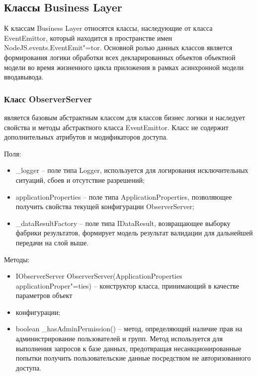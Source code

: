 \subsection{Классы Business Layer}
\label{sub:arch_and_mod:probab_net}

К классам Business Layer относятся классы, наследующие от класса EventEmittor, который находится в пространстве имен NodeJS.events.EventEmit"=tor. Основной ролью данных классов является формирования логики обработки всех декларированных объектов объектной модели во время жизненного цикла приложения в рамках асинхронной модели ввода\/вывода.

\subsubsection{Класс ObserverServer }
\label{sub:arch_and_mod:probab_net:observer}

является базовым абстрактным классом для классов бизнес логики и наследует свойства и методы абстрактного класса EventEmittor. Класс не содержит дополнительных атрибутов и модификаторов доступа.

Поля:
\begin{itemize}
  \item \_logger – поле типа Logger, используется для логирования исключительных ситуаций, сбоев и отсутствие разрешений;
  \item applicationProperties – поле типа ApplicationProperties, позволяющее получить свойства текущей конфигурации ObserverServer;
  \item \_dataResultFactory – поле типа IDataResult, возвращающее выборку фабрики результатов, формирует модель результат валидации для дальнейшей передачи на слой выше.
\end{itemize}

Методы:
\begin{itemize}
  \item IObserverServer ObserverServer(ApplicationProperties applicationProper"=ties) – конструктор класса, принимающий в качестве параметров объект
  \item конфигурации;
  \item boolean \_hasAdminPermission() – метод, определяющий наличие прав на администрирование пользователей и групп. Метод используется для выполнения запросов к базе данных, предотвращая несанкционированные попытки получить пользовательские данные посредством не авторизованного доступа.
\end{itemize}

